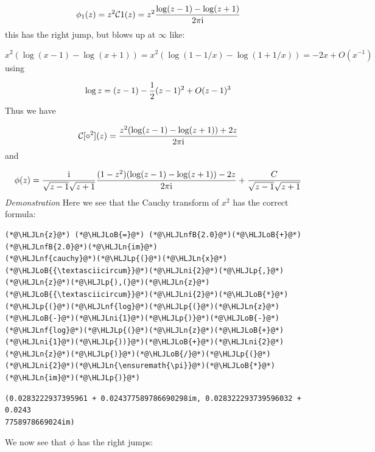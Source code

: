 \documentclass[12pt,a4paper]{article}
\newcommand{\HLJLn}[1]{#1}
\newcommand{\HLJLnf}[1]{\textcolor[RGB]{66,102,213}{#1}}
\newcommand{\HLJLnfB}[1]{\textcolor[RGB]{59,151,46}{#1}}
\newcommand{\HLJLni}[1]{\textcolor[RGB]{59,151,46}{#1}}
\newcommand{\HLJLoB}[1]{\textcolor[RGB]{102,102,102}{\textbf{#1}}}
\newcommand{\HLJLp}[1]{#1}
\def\I{ {\rm i} }
\def\CC{ {\cal C} }
\begin{document}
\[
\phi_1(z) = z^2 \CC1(z) = z^2 {\log(z-1) - \log(z+1) \over 2 \pi \I}
\]
this has the right jump, but blows up at $\infty$ like:

\[
x^2 (\log(x-1) - \log(x+1)) = x^2 (\log(1-1/x)  - \log(1+1/x) )
= -2 x + O(x^{-1})
\]
using

\[
\log z = (z-1) - {1\over 2}(z-1)^2 + O(z-1)^3
\]
Thus we have

\[
\CC[\diamond^2](z) = {z^2 (\log(z-1) - \log(z+1)) + 2 z \over 2 \pi \I}
\]
and

\[
\phi(z) = {\I \over \sqrt{z - 1} \sqrt{z+1}} {(1-z^2)(\log(z-1) - \log(z+1)) - 2 z \over 2 \pi \I}  + {C \over \sqrt{z-1}\sqrt{z+1}}
\]
\emph{Demonstration} Here we see that the Cauchy transform of $x^2$ has the correct formula:


\begin{lstlisting}
(*@\HLJLn{z}@*) (*@\HLJLoB{=}@*) (*@\HLJLnfB{2.0}@*)(*@\HLJLoB{+}@*)(*@\HLJLnfB{2.0}@*)(*@\HLJLn{im}@*)
(*@\HLJLnf{cauchy}@*)(*@\HLJLp{(}@*)(*@\HLJLn{x}@*)(*@\HLJLoB{{\textasciicircum}}@*)(*@\HLJLni{2}@*)(*@\HLJLp{,}@*) (*@\HLJLn{z}@*)(*@\HLJLp{),(}@*)(*@\HLJLn{z}@*)(*@\HLJLoB{{\textasciicircum}}@*)(*@\HLJLni{2}@*)(*@\HLJLoB{*}@*)(*@\HLJLp{(}@*)(*@\HLJLnf{log}@*)(*@\HLJLp{(}@*)(*@\HLJLn{z}@*)(*@\HLJLoB{-}@*)(*@\HLJLni{1}@*)(*@\HLJLp{)}@*)(*@\HLJLoB{-}@*)(*@\HLJLnf{log}@*)(*@\HLJLp{(}@*)(*@\HLJLn{z}@*)(*@\HLJLoB{+}@*)(*@\HLJLni{1}@*)(*@\HLJLp{))}@*)(*@\HLJLoB{+}@*)(*@\HLJLni{2}@*)(*@\HLJLn{z}@*)(*@\HLJLp{)}@*)(*@\HLJLoB{/}@*)(*@\HLJLp{(}@*)(*@\HLJLni{2}@*)(*@\HLJLn{\ensuremath{\pi}}@*)(*@\HLJLoB{*}@*)(*@\HLJLn{im}@*)(*@\HLJLp{)}@*)
\end{lstlisting}

\begin{lstlisting}
(0.0283222937395961 + 0.024377589786690298im, 0.028322293739596032 + 0.0243
7758978669024im)
\end{lstlisting}


We now see that $\phi$ has the right jumps:
\end{document}
